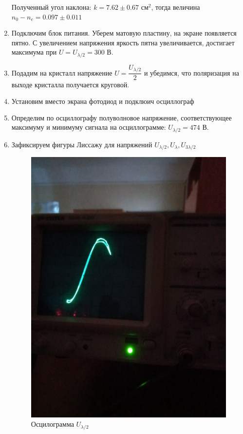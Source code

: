 \documentclass[a4paper, 12pt]{article}
\begin{document}
\begin{enumerate}
    Полученный угол наклона: $k = 7.62 \pm 0.67$ $см^2$, тогда величина $n_0 - n_e = 0.097 \pm 0.011$

    \item Подключим блок питания. Уберем матовую пластину, на экране появляется пятно. С увеличением напряжения яркость пятна увеличивается, достигает максимума при $U = U_{\lambda / 2} = 300$ В.
    
    \item Подадим на кристалл напряжение $U = \dfrac{U_{\lambda / 2}}{2}$ и убедимся, что поляризация на выходе кристалла получается круговой.

    \item Установим вместо экрана фотодиод и подклюич осциллограф
    
    \item Определим по осциллографу полуволновое напряжение, соответствующее максимуму и минимуму сигнала на осциллограмме: $U_{\lambda / 2} = 474$ В.
    
    \item Зафиксируем фигуры Лиссажу для напряжений $U_{\lambda / 2}, U_{\lambda}, U_{3\lambda / 2}$
    
    \begin{figure}
        \includegraphics[scale=0.3]{pic1.jpg}
        \centering
        \caption{Осцилограмма $U_{\lambda / 2}$}
        \label{pic1}
    \end{figure}


\end{enumerate}
\end{document}
